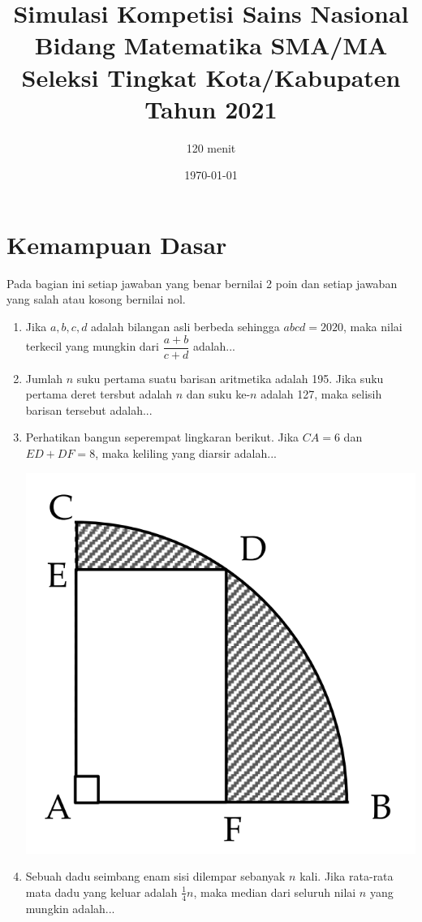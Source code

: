 \documentclass[12pt]{extarticle}
\title{Simulasi Kompetisi Sains Nasional Bidang Matematika SMA/MA Seleksi Tingkat Kota/Kabupaten Tahun 2021}
\author{120 menit}
\date{\today}
\begin{document}
	\maketitle
	
	\section{Kemampuan Dasar}
	Pada bagian ini setiap jawaban yang benar bernilai 2 poin dan setiap jawaban yang salah
	atau kosong bernilai nol.
	\begin{enumerate}
		
		
		\item Jika $a,b,c,d$ adalah bilangan asli berbeda sehingga $abcd=2020$, maka nilai terkecil yang mungkin dari $\dfrac{a+b}{c+d}$ adalah...
		
		\item Jumlah $n$ suku pertama suatu barisan aritmetika adalah 195. Jika suku pertama deret tersbut adalah $n$ dan suku ke-$n$ adalah 127, maka selisih barisan tersebut adalah...
		
		\item Perhatikan bangun seperempat lingkaran berikut. Jika $CA=6$ dan $ED+DF=8$, maka keliling yang diarsir adalah...
		
		\includegraphics[scale=0.5]{simulasi1-1}
		
		\item Sebuah dadu seimbang enam sisi dilempar sebanyak $n$ kali. Jika rata-rata mata dadu yang keluar adalah $\frac{1}{4}n$, maka median dari seluruh nilai $n$ yang mungkin adalah...
		

\end{enumerate}
\end{document}
